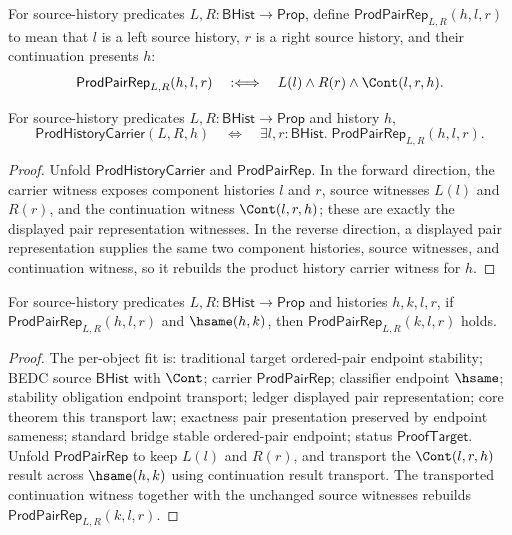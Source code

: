 \begin{definition}
\label{def:prod-pair-rep}
For source-history predicates $L,R:\mathsf{BHist}\to\mathsf{Prop}$, define
$\mathsf{ProdPairRep}_{L,R}(h,l,r)$ to mean that $l$ is a left source
history, $r$ is a right source history, and their continuation presents $h$:
$$
  \mathsf{ProdPairRep}_{L,R}(h,l,r)
  \quad:\Longleftrightarrow\quad
  L(l)\wedge R(r)\wedge \Cont(l,r,h).
$$
\end{definition}

\begin{theorem}
\label{thm:prod-pair-rep-coverage}
For source-history predicates $L,R:\mathsf{BHist}\to\mathsf{Prop}$ and history $h$,
$$
  \mathsf{ProdHistoryCarrier}(L,R,h)
  \quad\Longleftrightarrow\quad
  \exists l,r:\mathsf{BHist}.\;\mathsf{ProdPairRep}_{L,R}(h,l,r).
$$
\end{theorem}
\begin{proof}
Unfold $\mathsf{ProdHistoryCarrier}$ and $\mathsf{ProdPairRep}$. In the forward direction, the carrier witness exposes component histories $l$ and $r$, source witnesses $L(l)$ and $R(r)$, and the continuation witness $\Cont(l,r,h)$; these are exactly the displayed pair representation witnesses. In the reverse direction, a displayed pair representation supplies the same two component histories, source witnesses, and continuation witness, so it rebuilds the product history carrier witness for $h$.
\end{proof}

\begin{theorem}
\label{thm:prod-pair-rep-hsame-transport}
For source-history predicates $L,R:\mathsf{BHist}\to\mathsf{Prop}$ and histories
$h,k,l,r$, if $\mathsf{ProdPairRep}_{L,R}(h,l,r)$ and $\hsame(h,k)$, then
$\mathsf{ProdPairRep}_{L,R}(k,l,r)$ holds.
\end{theorem}
\begin{proof}
The per-object fit is: traditional target ordered-pair endpoint stability; BEDC
source $\mathsf{BHist}$ with $\Cont$; carrier $\mathsf{ProdPairRep}$;
classifier endpoint $\hsame$; stability obligation endpoint transport; ledger
displayed pair representation; core theorem this transport law; exactness pair
presentation preserved by endpoint sameness; standard bridge stable ordered-pair
endpoint; status $\mathsf{ProofTarget}$. Unfold $\mathsf{ProdPairRep}$ to keep
$L(l)$ and $R(r)$, and transport the $\Cont(l,r,h)$ result across $\hsame(h,k)$
using continuation result transport. The transported continuation witness
together with the unchanged source witnesses rebuilds
$\mathsf{ProdPairRep}_{L,R}(k,l,r)$.
\end{proof}

